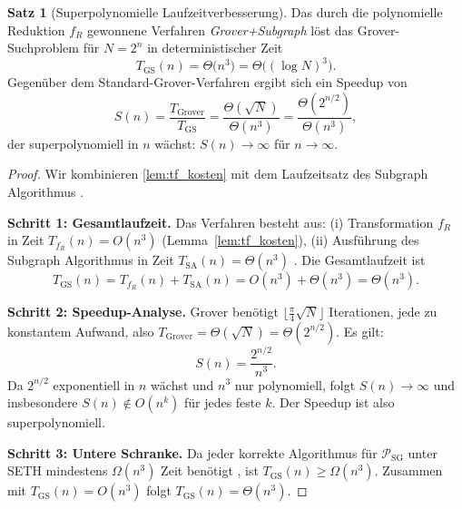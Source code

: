 ﻿\documentclass[11pt,a4paper]{article}
\theoremstyle{definition}
\newtheorem{theorem}{Satz}[section]
\begin{document}
\begin{theorem}[Superpolynomielle Laufzeitverbesserung]
\label{thm:hauptsatz}
  Das durch die polynomielle Reduktion $f_R$ gewonnene Verfahren
  \emph{Grover+Subgraph} löst das Grover-Suchproblem für $N = 2^n$ in
  deterministischer Zeit
  \begin{equation}
    T_{\mathrm{GS}}(n) = \Theta\!\bigl(n^3\bigr) = \Theta\!\bigl((\log N)^3\bigr).
    \label{eq:T_GS}
  \end{equation}
  Gegenüber dem Standard-Grover-Verfahren ergibt sich ein Speedup von
  \begin{equation}
    S(n) = \frac{T_{\mathrm{Grover}}}{T_{\mathrm{GS}}}
          = \frac{\Theta(\sqrt{N})}{\Theta(n^3)}
          = \frac{\Theta(2^{n/2})}{\Theta(n^3)},
    \label{eq:speedup}
  \end{equation}
  der superpolynomiell in $n$ wächst: $S(n) \to \infty$ für $n \to \infty$.
\end{theorem}

\begin{proof}
  Wir kombinieren \cref{lem:tf_kosten} mit dem Laufzeitsatz des Subgraph
  Algorithmus \cite{Epp2026}.

  \textbf{Schritt 1: Gesamtlaufzeit.}
  Das Verfahren besteht aus:
  (i) Transformation $f_R$ in Zeit $T_{f_R}(n) = O(n^3)$ (Lemma~\ref{lem:tf_kosten}),
  (ii) Ausführung des Subgraph Algorithmus in Zeit $T_{\mathrm{SA}}(n) = \Theta(n^3)$
  \cite{Epp2026}.  Die Gesamtlaufzeit ist
  \begin{equation}
    T_{\mathrm{GS}}(n) = T_{f_R}(n) + T_{\mathrm{SA}}(n) = O(n^3) + \Theta(n^3)
    = \Theta(n^3).
  \end{equation}

  \textbf{Schritt 2: Speedup-Analyse.}
  Grover benötigt $\lfloor \tfrac{\pi}{4}\sqrt{N} \rfloor$ Iterationen,
  jede zu konstantem Aufwand, also $T_{\mathrm{Grover}} = \Theta(\sqrt{N}) = \Theta(2^{n/2})$.
  Es gilt:
  \begin{equation}
    S(n) = \frac{2^{n/2}}{n^3}.
  \end{equation}
  Da $2^{n/2}$ exponentiell in $n$ wächst und $n^3$ nur polynomiell,
  folgt $S(n) \to \infty$ und insbesondere $S(n) \notin O(n^k)$ für jedes
  feste $k$.  Der Speedup ist also superpolynomiell.

  \textbf{Schritt 3: Untere Schranke.}
  Da jeder korrekte Algorithmus für $\mathcal{P}_{\mathrm{SG}}$ unter SETH
  mindestens $\Omega(n^3)$ Zeit benötigt \cite{Epp2026}, ist
  $T_{\mathrm{GS}}(n) \geq \Omega(n^3)$.  Zusammen mit $T_{\mathrm{GS}}(n) = O(n^3)$
  folgt $T_{\mathrm{GS}}(n) = \Theta(n^3)$.
\end{proof}
\end{document}
